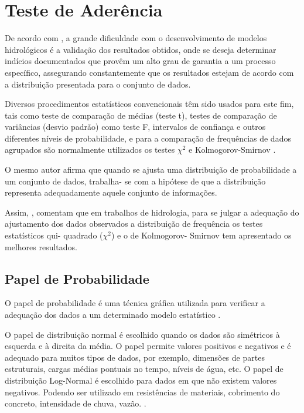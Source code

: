 \section{Teste de Aderência}

De acordo com , a grande dificuldade com o desenvolvimento de modelos hidrológicos é a validação dos resultados obtidos, onde se deseja determinar indícios documentados que provêm um alto grau de garantia a um processo específico, assegurando constantemente que os resultados estejam de acordo com a distribuição presentada para o conjunto de dados.

Diversos procedimentos estatísticos convencionais têm sido usados para este fim, tais como teste de comparação de médias (teste t), testes de comparação de variâncias (desvio padrão) como teste F, intervalos de confiança e outros diferentes níveis de probabilidade, e para a comparação de frequências de dados agrupados são normalmente utilizados os testes $\chi^2$ e Kolmogorov-Smirnov \cite{oliveira}.

O mesmo autor afirma que quando se ajusta uma distribuição de probabilidade a um conjunto de dados, trabalha- se com a hipótese de que a distribuição representa adequadamente aquele conjunto de informações.

Assim, , comentam que em trabalhos de hidrologia, para se julgar a adequação do ajustamento dos dados observados a distribuição de frequência os testes estatísticos qui- quadrado ($\chi^2$) e o de Kolmogorov- Smirnov tem apresentado os melhores resultados.

\subsection{Papel de Probabilidade}

O papel de probabilidade é uma técnica gráfica utilizada para verificar a adequação dos dados a um determinado modelo estatístico \cite{papel}.

O papel de distribuição normal é escolhido quando os dados são simétricos à esquerda e à direita da média. O papel permite valores positivos e negativos e é adequado para muitos tipos de dados, por exemplo, dimensões de partes estruturais, cargas médias pontuais no tempo, níveis de água, etc. O papel de distribuição Log-Normal é escolhido para dados em que não existem valores negativos. Podendo ser utilizado em resistências de materiais, cobrimento do concreto, intensidade de chuva, vazão. \cite{papel}.

